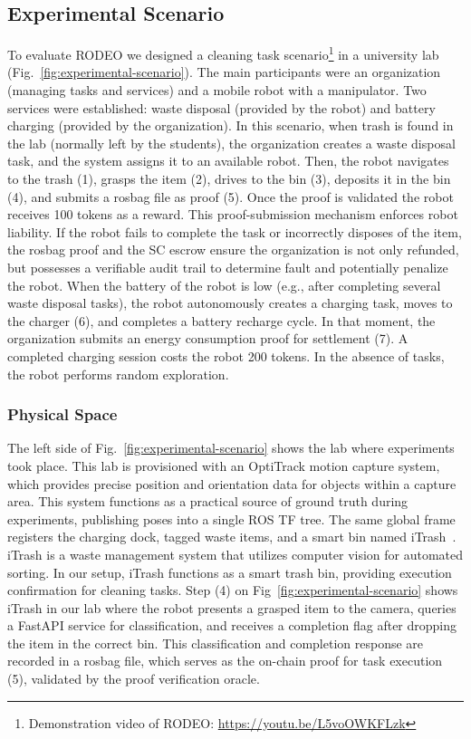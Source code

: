 \documentclass[letterpaper, 10 pt, conference]{ieeeconf}  %
\begin{document}
\subsection{Experimental Scenario}
To evaluate RODEO we designed a cleaning task scenario\footnote{Demonstration video of RODEO: \url{https://youtu.be/L5voOWKFLzk}} in a university lab (Fig.~\ref{fig:experimental-scenario}). The main participants were an organization (managing tasks and services) and a mobile robot with a manipulator. Two services were established: waste disposal (provided by the robot) and battery charging (provided by the organization). In this scenario, when trash is found in the lab (normally left by the students), the organization creates a waste disposal task, and the system assigns it to an available robot. Then, the robot navigates to the trash (1), grasps the item (2), drives to the bin (3), deposits it in the bin (4), and submits a rosbag file as proof (5). Once the proof is validated the robot receives 100 tokens as a reward. This proof-submission mechanism enforces robot liability. If the robot fails to complete the task or incorrectly disposes of the item, the rosbag proof and the SC escrow ensure the organization is not only refunded, but possesses a verifiable audit trail to determine fault and potentially penalize the robot. When the battery of the robot is low (e.g., after completing several waste disposal tasks), the robot autonomously creates a charging task, moves to the charger (6), and completes a battery recharge cycle. In that moment, the organization submits an energy consumption proof for settlement (7). A completed charging session costs the robot 200 tokens. In the absence of tasks, the robot performs random exploration.

\subsubsection{Physical Space}
The left side of Fig.~\ref{fig:experimental-scenario} shows the lab where experiments took place. This lab is provisioned with an OptiTrack motion capture system, which provides precise position and orientation data for objects within a capture area. This system functions as a practical source of ground truth during experiments, publishing poses into a single ROS TF tree. The same global frame registers the charging dock, tagged waste items, and a smart bin named iTrash~\cite{iTrash}. iTrash is a waste management system that utilizes computer vision for automated sorting. In our setup, iTrash functions as a smart trash bin, providing execution confirmation for cleaning tasks. Step (4) on Fig~\ref{fig:experimental-scenario} shows iTrash in our lab where the robot presents a grasped item to the camera, queries a FastAPI service for classification, and receives a completion flag after dropping the item in the correct bin. This classification and completion response are recorded in a rosbag file, which serves as the on-chain proof for task execution (5), validated by the proof verification oracle.
\end{document}
